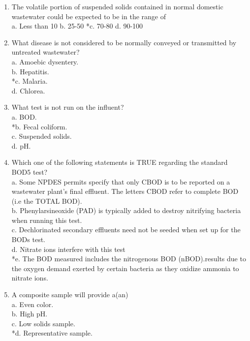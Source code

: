 \begin{enumerate}
\item The volatile portion of suspended solids contained in normal domestic wastewater could be expected to be in the range of \\

a. Less than 10 %
b. 25-50%
*c. 70-80%
d. 90-100%

\item What disease is not considered to be normally conveyed or transmitted by untreated wastewater? \\

a. Amoebic dysentery. \\
b. Hepatitis. \\
*c. Malaria. \\
d. Chlorea. 

\item What test is not run on the influent? \\

a. BOD. \\
*b. Fecal coliform. \\
c. Suspended solids. \\
d. pH. 

\item Which one of the following statements is TRUE regarding the standard BOD5 test? \\

a. Some NPDES permits specify that only CBOD is to be reported on a wastewater plant's final effluent. The letters CBOD refer to complete BOD (i.e the TOTAL BOD). \\
b. Phenylarsineoxide (PAD) is typically added to destroy nitrifying bacteria when running this test. \\
c. Dechlorinated secondary effluents need not be seeded when set up for the BODs test. \\
d. Nitrate ions interfere with this test \\
*e. The BOD measured includes the nitrogenous BOD (nBOD).results due to the oxygen demand exerted by certain bacteria as they oxidize ammonia to nitrate ions. 

\item A composite sample will provide a(an) \\

a. Even color. \\
b. High pH. \\
c. Low solids sample. \\
*d. Representative sample. 


\end{enumerate}
